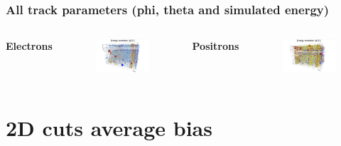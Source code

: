 \documentclass{beamer}
\begin{document}
	\begin{frame}
		\frametitle{All track parameters (phi, theta and simulated energy)}		
		\begin{columns}
			\centering
			\Large \textbf{Electrons}
			\begin{figure}
				\centering
				\includegraphics[width = 0.95 \linewidth]{images/c_e_all.png}
			\end{figure}
			\centering
			\Large \textbf{Positrons}
			\begin{figure}
				\centering
				\includegraphics[width = 0.95 \linewidth]{images/c_p_all.png}
			\end{figure}
		\end{columns}
	\end{frame}
	
	
	\section{2D cuts average bias}
	
\end{document}

